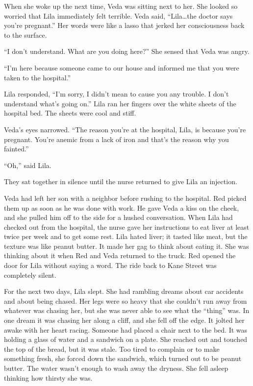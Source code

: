 \documentclass[
  american,
  letterpaper,
]{book}
\begin{document}
When she woke up the next time, Veda was sitting next to her. She looked
so worried that Lila immediately felt terrible. Veda said,
``Lila\ldots the doctor says you're pregnant.'' Her words were like a
lasso that jerked her consciousness back to the surface.

``I don't understand. What are you doing here?'' She sensed that Veda
was angry.

``I'm here because someone came to our house and informed me that you
were taken to the hospital.''

Lila responded, ``I'm sorry, I didn't mean to cause you any trouble. I
don't understand what's going on.'' Lila ran her fingers over the white
sheets of the hospital bed. The sheets were cool and stiff.

Veda's eyes narrowed. ``The reason you're at the hospital, Lila, is
because you're pregnant. You're anemic from a lack of iron and that's
the reason why you fainted.''

``Oh,'' said Lila.

They sat together in silence until the nurse returned to give Lila an
injection.

Veda had left her son with a neighbor before rushing to the hospital.
Red picked them up as soon as he was done with work. He gave Veda a kiss
on the cheek, and she pulled him off to the side for a hushed
conversation. When Lila had checked out from the hospital, the nurse
gave her instructions to eat liver at least twice per week and to get
some rest. Lila hated liver; it tasted like meat, but the texture was
like peanut butter. It made her gag to think about eating it. She was
thinking about it when Red and Veda returned to the truck. Red opened
the door for Lila without saying a word. The ride back to Kane Street
was completely silent.

For the next two days, Lila slept. She had rambling dreams about car
accidents and about being chased. Her legs were so heavy that she
couldn't run away from whatever was chasing her, but she was never able
to see what the ``thing'' was. In one dream it was chasing her along a
cliff, and she fell off the edge. It jolted her awake with her heart
racing. Someone had placed a chair next to the bed. It was holding a
glass of water and a sandwich on a plate. She reached out and touched
the top of the bread, but it was stale. Too tired to complain or to make
something fresh, she forced down the sandwich, which turned out to be
peanut butter. The water wasn't enough to wash away the dryness. She
fell asleep thinking how thirsty she was.
\end{document}
